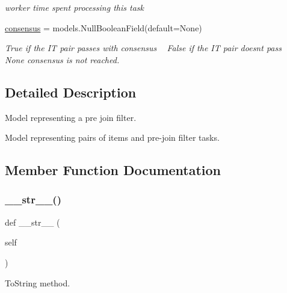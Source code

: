 \begin{DoxyCompactItemize}
\begin{DoxyCompactList}\small\item\em worker time spent processing this task \end{DoxyCompactList}\item 
\mbox{\hyperlink{classjoinapp_1_1models_1_1task__management__models_1_1_p_j_f_task_acd4d1b3226891bb64f1fb71cff3a390e}{consensus}} = models.\+Null\+Boolean\+Field(default=None)
\begin{DoxyCompactList}\small\item\em True if the IT pair passes with consensus ~\newline
 False if the IT pair doesn\textquotesingle{}t pass ~\newline
 None consensus is not reached. \end{DoxyCompactList}\end{DoxyCompactItemize}


\subsection{Detailed Description}
Model representing a pre join filter. 

\begin{DoxyVerb}Model representing pairs of items and pre-join filter tasks.
\end{DoxyVerb}
 

\subsection{Member Function Documentation}
\mbox{\label{classjoinapp_1_1models_1_1task__management__models_1_1_p_j_f_task_a23e8041ce1015febe4fdace3225714f9}} 
\subsubsection{\texorpdfstring{\_\_str\_\_()}{\_\_str\_\_()}}
{\footnotesize\ttfamily def \+\_\+\+\_\+str\+\_\+\+\_\+ (\begin{DoxyParamCaption}\item[{}]{self }\end{DoxyParamCaption})}



To\+String method. 



